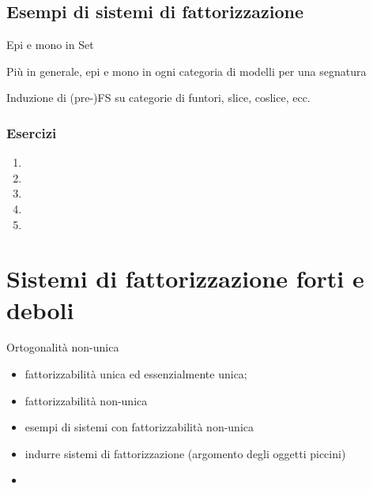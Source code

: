 \subsection{Esempi di sistemi di fattorizzazione}
\begin{example}
Epi e mono in Set
\end{example}
Più in generale, epi e mono in ogni categoria di modelli per una segnatura
\begin{example}

\end{example}

\begin{example}

\end{example}

\begin{example}

\end{example}

\begin{example}

\end{example}

\begin{example}
Induzione di (pre-)FS su categorie di funtori, slice, coslice, ecc.
\end{example}

\subsubsection*{Esercizi}
\begin{enumerate}
	\item
	\item
	\item
	\item
	\item
\end{enumerate}
\section[Fattorizzazione]{Sistemi di fattorizzazione forti e deboli}
Ortogonalità non-unica
\begin{itemize}
	\item fattorizzabilità unica ed essenzialmente unica;
	\item fattorizzabilità non-unica
	\item esempi di sistemi con fattorizzabilità non-unica
	\item indurre sistemi di fattorizzazione (argomento degli oggetti piccini)
	\item
\end{itemize}
